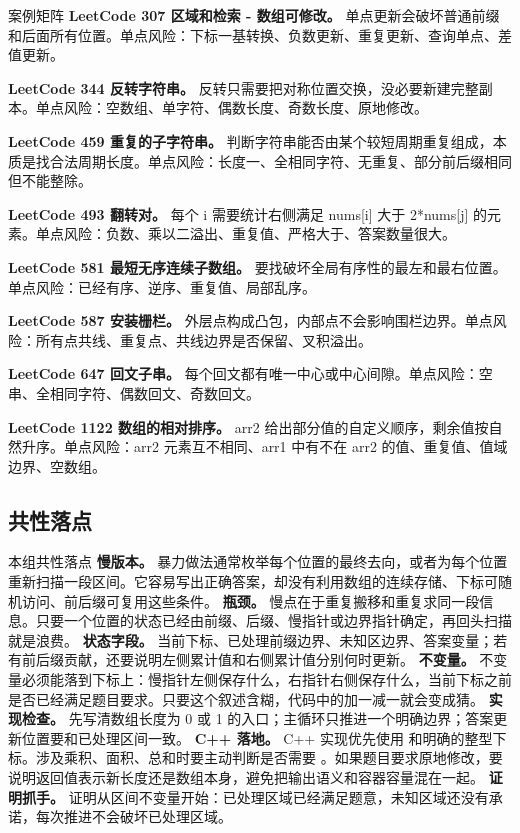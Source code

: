 \begin{principlebox}{案例矩阵}
\textbf{LeetCode 307 区域和检索 - 数组可修改。}
单点更新会破坏普通前缀和后面所有位置。单点风险：下标一基转换、负数更新、重复更新、查询单点、差值更新。

\textbf{LeetCode 344 反转字符串。}
反转只需要把对称位置交换，没必要新建完整副本。单点风险：空数组、单字符、偶数长度、奇数长度、原地修改。

\textbf{LeetCode 459 重复的子字符串。}
判断字符串能否由某个较短周期重复组成，本质是找合法周期长度。单点风险：长度一、全相同字符、无重复、部分前后缀相同但不能整除。

\textbf{LeetCode 493 翻转对。}
每个 i 需要统计右侧满足 nums[i] 大于 2*nums[j] 的元素。单点风险：负数、乘以二溢出、重复值、严格大于、答案数量很大。

\textbf{LeetCode 581 最短无序连续子数组。}
要找破坏全局有序性的最左和最右位置。单点风险：已经有序、逆序、重复值、局部乱序。

\textbf{LeetCode 587 安装栅栏。}
外层点构成凸包，内部点不会影响围栏边界。单点风险：所有点共线、重复点、共线边界是否保留、叉积溢出。

\textbf{LeetCode 647 回文子串。}
每个回文都有唯一中心或中心间隙。单点风险：空串、全相同字符、偶数回文、奇数回文。

\textbf{LeetCode 1122 数组的相对排序。}
arr2 给出部分值的自定义顺序，剩余值按自然升序。单点风险：arr2 元素互不相同、arr1 中有不在 arr2 的值、重复值、值域边界、空数组。

\end{principlebox}

\subsection{共性落点}

\begin{principlebox}{本组共性落点}
\textbf{慢版本。} 暴力做法通常枚举每个位置的最终去向，或者为每个位置重新扫描一段区间。它容易写出正确答案，却没有利用数组的连续存储、下标可随机访问、前后缀可复用这些条件。
\textbf{瓶颈。} 慢点在于重复搬移和重复求同一段信息。只要一个位置的状态已经由前缀、后缀、慢指针或边界指针确定，再回头扫描就是浪费。
\textbf{状态字段。} 当前下标、已处理前缀边界、未知区边界、答案变量；若有前后缀贡献，还要说明左侧累计值和右侧累计值分别何时更新。
\textbf{不变量。} 不变量必须能落到下标上：慢指针左侧保存什么，右指针右侧保存什么，当前下标之前是否已经满足题目要求。只要这个叙述含糊，代码中的加一减一就会变成猜。
\textbf{实现检查。} 先写清数组长度为 0 或 1 的入口；主循环只推进一个明确边界；答案更新位置要和已处理区间一致。
\textbf{C++ 落地。} C++ 实现优先使用  和明确的整型下标。涉及乘积、面积、总和时要主动判断是否需要 。如果题目要求原地修改，要说明返回值表示新长度还是数组本身，避免把输出语义和容器容量混在一起。
\textbf{证明抓手。} 证明从区间不变量开始：已处理区域已经满足题意，未知区域还没有承诺，每次推进不会破坏已处理区域。
\end{principlebox}

